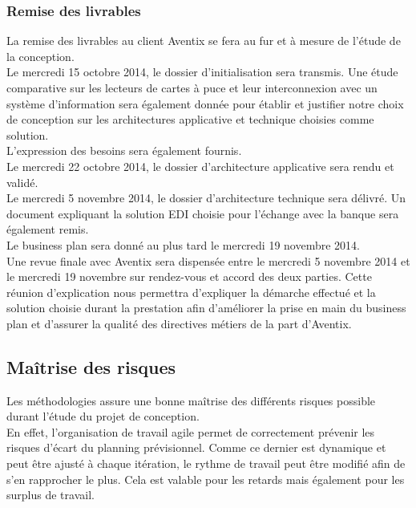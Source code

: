 \documentclass[11pt, a4paper]{article}
\begin{document}
\subsubsection{Remise des livrables}
La remise des livrables au client Aventix se fera au fur et à mesure de l'étude
de la conception. \\

Le mercredi 15 octobre 2014, le dossier d'initialisation sera transmis.
Une étude comparative sur les lecteurs de cartes à puce et leur interconnexion
avec un système d'information sera également donnée pour établir et justifier
notre choix de conception sur les architectures applicative et technique
choisies comme solution. \\
L'expression des besoins sera également fournis. \\

Le mercredi 22 octobre 2014, le dossier d'architecture applicative sera rendu
et validé. \\

Le mercredi 5 novembre 2014, le dossier d'architecture technique sera délivré.
Un document expliquant la solution EDI choisie pour l'échange avec la banque
sera également remis. \\

Le business plan sera donné au plus tard le mercredi 19 novembre 2014. \\

Une revue finale avec Aventix sera dispensée entre le mercredi 5 novembre 2014
et le mercredi 19 novembre sur rendez-vous et accord des deux parties.
Cette réunion d'explication nous permettra d'expliquer la démarche effectué et
la solution choisie durant la prestation afin d'améliorer la prise en main du
business plan et d'assurer la qualité des directives métiers de la part
d'Aventix. \\

\subsection{Maîtrise des risques}
Les méthodologies assure une bonne maîtrise des différents risques possible
durant l'étude du projet de conception. \\

En effet, l'organisation de travail agile permet de correctement prévenir les
risques d'écart du planning prévisionnel. Comme ce dernier est dynamique et
peut être ajusté à chaque itération, le rythme de travail peut être modifié
afin de s'en rapprocher le plus. Cela est valable pour les retards mais
également pour les surplus de travail. \\
\end{document}
